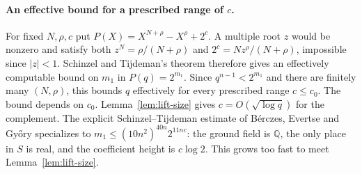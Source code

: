 \documentclass[11pt]{article}
\begin{document}
\paragraph{An effective bound for a prescribed range of $c$.}
For fixed $N,\rho,c$ put $P(X)=X^{N+\rho}-X^\rho+2^c$.
A multiple root $z$ would be nonzero and satisfy both
$z^N=\rho/(N+\rho)$ and $2^c=Nz^\rho/(N+\rho)$, impossible
since $|z|<1$. Schinzel and Tijdeman's theorem
\cite{SchinzelTijdeman} therefore gives an effectively computable bound
on $m_1$ in $P(q)=2^{m_1}$. Since $q^{n-1}<2^{m_1}$ and
there are finitely many $(N,\rho)$, this bounds $q$ effectively
for every prescribed range $c\le c_0$. The bound depends on $c_0$.
Lemma~\ref{lem:lift-size} gives $c=O(\sqrt{\log q})$ for the
complement. The explicit Schinzel--Tijdeman estimate of
Bérczes, Evertse and Győry \cite[Thm.~2.3]{BEG} specializes to
$m_1\le (10n^2)^{40n}2^{11nc}$: the ground field is $\mathbb Q$,
the only place in $S$ is real, and the coefficient height is $c\log2$.
This grows too fast to meet Lemma~\ref{lem:lift-size}.
\end{document}

